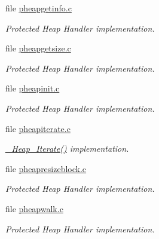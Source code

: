 \begin{DoxyCompactItemize}
file \mbox{\hyperlink{pheapgetinfo_8c}{pheapgetinfo.\+c}}
\begin{DoxyCompactList}\small\item\em Protected Heap Handler implementation. \end{DoxyCompactList}\item 
file \mbox{\hyperlink{pheapgetsize_8c}{pheapgetsize.\+c}}
\begin{DoxyCompactList}\small\item\em Protected Heap Handler implementation. \end{DoxyCompactList}\item 
file \mbox{\hyperlink{pheapinit_8c}{pheapinit.\+c}}
\begin{DoxyCompactList}\small\item\em Protected Heap Handler implementation. \end{DoxyCompactList}\item 
file \mbox{\hyperlink{pheapiterate_8c}{pheapiterate.\+c}}
\begin{DoxyCompactList}\small\item\em \mbox{\hyperlink{group__RTEMSScoreHeap_ga568d8a3b62e8b4b060940770bdeee254}{\+\_\+\+Heap\+\_\+\+Iterate()}} implementation. \end{DoxyCompactList}\item 
file \mbox{\hyperlink{pheapresizeblock_8c}{pheapresizeblock.\+c}}
\begin{DoxyCompactList}\small\item\em Protected Heap Handler implementation. \end{DoxyCompactList}\item 
file \mbox{\hyperlink{pheapwalk_8c}{pheapwalk.\+c}}
\begin{DoxyCompactList}\small\item\em Protected Heap Handler implementation. \end{DoxyCompactList}\end{DoxyCompactItemize}
